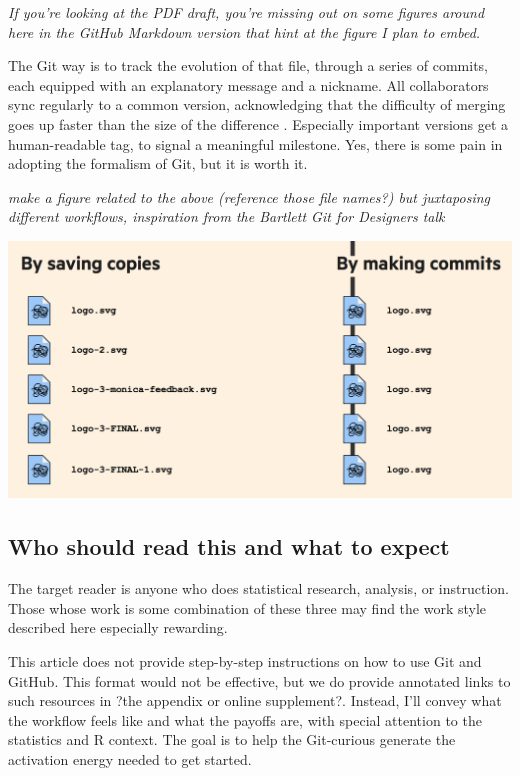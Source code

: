 \documentclass[12pt]{article}
\begin{document}
\emph{If you're looking at the PDF draft, you're missing out on some
figures around here in the GitHub Markdown version that hint at the
figure I plan to embed.}

The Git way is to track the evolution of that file, through a series of
commits, each equipped with an explanatory message and a nickname. All
collaborators sync regularly to a common version, acknowledging that the
difficulty of merging goes up faster than the size of the difference
\citep{good-enough}. Especially important versions get a human-readable
tag, to signal a meaningful milestone. Yes, there is some pain in
adopting the formalism of Git, but it is worth it.

\emph{make a figure related to the above (reference those file names?)
but juxtaposing different workflows, inspiration from the Bartlett Git
for Designers talk}

\includegraphics[width=1\linewidth]{bartlett-copies-vs-commits}

\subsection{Who should read this and what to
expect}\label{who-should-read-this-and-what-to-expect}

The target reader is anyone who does statistical research, analysis, or
instruction. Those whose work is some combination of these three may
find the work style described here especially rewarding.

This article does not provide step-by-step instructions on how to use
Git and GitHub. This format would not be effective, but we do provide
annotated links to such resources in ?the appendix or online
supplement?. Instead, I'll convey what the workflow feels like and what
the payoffs are, with special attention to the statistics and R context.
The goal is to help the Git-curious generate the activation energy
needed to get started.
\end{document}
